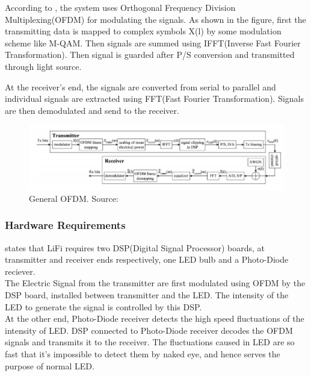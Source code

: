 \documentclass{article}
\begin{document}
According to \textcite{dimitrov12}, the system uses Orthogonal Frequency Division
Multiplexing(OFDM) for modulating the signals. As shown in the figure, first
the transmitting data is mapped to complex symbols X(l) by some modulation
scheme like M-QAM.  Then signals are summed using IFFT(Inverse Fast Fourier
Transformation).  Then signal is guarded after P/S conversion and transmitted
through light source.

At the receiver's end, the signals are converted from serial to parallel and
individual signals are extracted using FFT(Fast Fourier Transformation).
Signals are then demodulated and send to the receiver.

\begin{figure}[!h]
  \includegraphics[width=\linewidth]{res/OFDM_li_fi.PNG}
    \caption{General OFDM. Source: \parencite{dimitrov12}}
  \label{fig:OFDM_li_fi}
\end{figure}


\subsubsection{Hardware Requirements}

\textcite{elgala09} states that LiFi requires two DSP(Digital Signal Processor)
boards, at transmitter and receiver ends respectively, one LED bulb and a
Photo-Diode reciever.\\ The Electric Signal from the transmitter are first
modulated using OFDM by the DSP board, installed between transmitter and the
LED.  The intensity of the LED to generate the signal is controlled by this
DSP.\\

At the other end, Photo-Diode receiver detects the high speed fluctuations of
the intensity of LED. DSP connected to Photo-Diode receiver decodes the OFDM
signals and transmits it to the receiver.  The fluctuations caused in LED are
so fast that it's impossible to detect them by naked eye, and hence serves the
purpose of normal LED.
\end{document}
